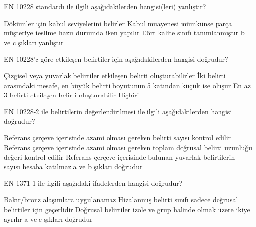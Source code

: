\begin{question}[subtitle= EN 10228-2]
  EN 10228 standardı ile ilgili aşağıdakilerden hangisi(leri) yanlıştır?
	\begin{tasks}
		\task Dökümler için kabul seviyelerini belirler \correct
		\task Kabul muayenesi mümkünse parça müşteriye teslime hazır durumda iken yapılır
		\task Dört kalite sınıfı tanımlanmıştır
		\task b ve c şıkları yanlıştır
	\end{tasks}
\end{question}
\begin{solution}
	\correct
\end{solution}

\begin{question}[subtitle= EN 10228-2]
  EN 10228'e göre etkileşen belirtiler için aşağıdakilerden hangisi doğrudur?
	\begin{tasks}
		\task Çizgisel veya yuvarlak belirtiler etkileşen belirti oluşturabilirler
		\task İki belirti arasındaki mesafe, en büyük belirti boyutunun 5 katından küçük ise oluşur
		\task En az 3 belirti etkileşen belirti oluşturabilir
		\task Hiçbiri \correct
	\end{tasks}
\end{question}
\begin{solution}
	\correct
\end{solution}

\begin{question}[subtitle= EN 10228-2]
  EN 10228-2 ile belirtilerin değerlendirilmesi ile ilgili aşağıdakilerden hangisi doğrudur?
	\begin{tasks}
		\task Referans çerçeve içerisinde azami olması gereken belirti sayısı kontrol edilir
		\task Referans çerçeve içerisinde azami olması gereken toplam doğrusal belirti uzunluğu değeri kontrol edilir
		\task Referans çerçeve içerisinde bulunan yuvarlak belirtilerin sayısı hesaba katılmaz
		\task a ve b şıkları doğrudur \correct
	\end{tasks}
\end{question}
\begin{solution}
	\correct
\end{solution}

\begin{question}[subtitle= EN 1371-1]
  EN 1371-1 ile ilgili aşağıdaki ifadelerden hangisi doğrudur?
	\begin{tasks}
		\task Bakır/bronz alaşımlara uygulanamaz \correct
		\task Hizalanmış belirti sınıfı sadece doğrusal belirtiler için geçerlidir
		\task Doğrusal belirtiler izole ve grup halinde olmak üzere ikiye ayrılır
		\task a ve c şıkları doğrudur
	\end{tasks}
\end{question}
\begin{solution}
	\correct
\end{solution}

